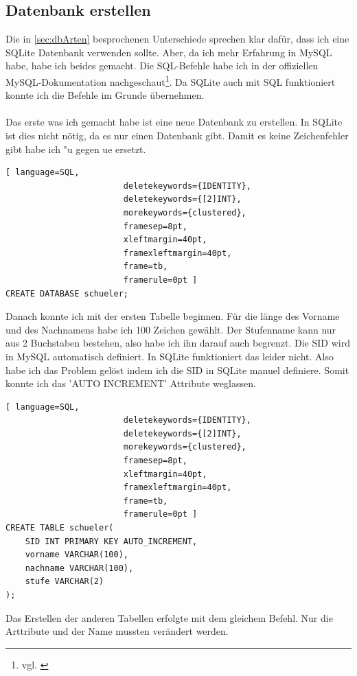\documentclass[a4paper, 12pt]{article}
\theoremstyle{plain}
\theoremstyle{definition}
\begin{document}
	\subsection{Datenbank erstellen}
	\label{sec:dbErst}
	Die in \ref{sec:dbArten} besprochenen Unterschiede sprechen klar dafür, dass ich eine SQLite Datenbank verwenden sollte. Aber, da ich mehr Erfahrung in MySQL habe, habe ich beides gemacht. Die SQL-Befehle habe ich in der offiziellen MySQL-Dokumentation nachgeschaut\footnote{vgl. \cite{sqlDocu}}. Da SQLite auch mit SQL funktioniert konnte ich die Befehle im Grunde übernehmen. \\ 
	\\
Das erste was ich gemacht habe ist eine neue Datenbank zu erstellen. In SQLite ist dies nicht nötig, da es nur einen Datenbank gibt. Damit es keine Zeichenfehler gibt habe ich "u gegen ue ersetzt.
	\begin{lstlisting}[ language=SQL,
	                    deletekeywords={IDENTITY},
	                    deletekeywords={[2]INT},
	                    morekeywords={clustered},
	                    framesep=8pt,
	                    xleftmargin=40pt,
	                    framexleftmargin=40pt,
	                    frame=tb,
	                    framerule=0pt ]
CREATE DATABASE schueler;
	\end{lstlisting}
Danach konnte ich mit der ersten Tabelle beginnen. Für die länge des Vorname und des Nachnamens habe ich 100 Zeichen gewählt. Der Stufenname kann nur aus 2 Buchstaben bestehen, also habe ich ihn darauf auch begrenzt. Die SID wird in MySQL automatisch definiert. In SQLite funktioniert das leider nicht. Also habe ich das Problem gelöst indem ich die SID in SQLite manuel definiere. Somit konnte ich das 'AUTO INCREMENT' Attribute weglassen.
	\begin{lstlisting}[ language=SQL,
	                    deletekeywords={IDENTITY},
	                    deletekeywords={[2]INT},
	                    morekeywords={clustered},
	                    framesep=8pt,
	                    xleftmargin=40pt,
	                    framexleftmargin=40pt,
	                    frame=tb,
	                    framerule=0pt ]
CREATE TABLE schueler(
	SID INT PRIMARY KEY AUTO_INCREMENT, 
	vorname VARCHAR(100), 
	nachname VARCHAR(100), 
	stufe VARCHAR(2)
);
	\end{lstlisting}

Das Erstellen der anderen Tabellen erfolgte mit dem gleichem Befehl. Nur die Arttribute und der Name mussten verändert werden.
\end{document}
